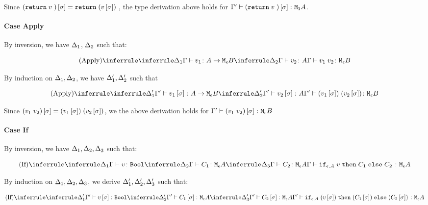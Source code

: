 {        Since $(\texttt{return} \; v\;)\left[\sigma\right] = \texttt{return} \;(v\left[\sigma\right])\;$, the type derivation above holds for $\Gamma' \vdash (\texttt{return} \; v\;)\left[\sigma\right] \colon \texttt{M}_{\texttt{1}}{A}$.

    \paragraph{Case Apply}
        By inversion, we have $\Delta_1$, $\Delta_2$ such that:

        \begin{equation}
            \ntreeruleII{Apply}{
                \treeruleI{\D_1}{\typerelation{\G}{v_1}{\aeb}}
                }{
                \treeruleI{\D_2}{\typerelation{\G}{v_2}{A}}
            }{\typerelation{\G}{\apply{v_1}{v_2}}{\meb}}
        \end{equation}

        By induction on $\Delta_1, \Delta_2$, we have $\Delta_1',\Delta_2'$ such that

        \begin{equation}
            \ntreeruleII{Apply}{
                \treeruleI{\D'_1}{\typerelation{\G'}{v_1\ssi}{\aeb}}
                }{
                \treeruleI{\D_2'}{\typerelation{\G'}{v_2\ssi}{A}}
            }{\typerelation{\G'}{\apply{(v_1\ssi)}{(v_2\ssi)}}{\meb}}
        \end{equation}

        Since $(v_1\; v_2)\left[\sigma\right] = (v_1\left[\sigma\right])\;(v_2\left[\sigma\right])$, we the above derivation holds for $\Gamma' \vdash (v_1\; v_2)\left[\sigma\right] \colon \texttt{M}_{\epsilon}{B}$
    \paragraph{Case If}
        By inversion, we have $\Delta_1,\Delta_2,\Delta_3$ such that:

        \begin{equation}
            \ntreeruleIII{If}{
                \treeruleI{\D_1}{\typerelation{\G}{v}{\B}}
                }{
                \treeruleI{\D_2}{\typerelation{\G}{C_1}{\mea}}
                }{
                \treeruleI{\D_3}{\typerelation{\G}{C_2}{\mea}}
            }{
                \typerelation{\G}{\ifthenelse{\e}{A}{v}{C_1}{C_2}}{\mea}
            }
        \end{equation}

        By induction on $\Delta_1,\Delta_2, \Delta_3$, we derive 
        $\Delta_1', \Delta_2',\Delta_3'$ such that:
        
        \begin{equation}
            \ntreeruleIII{If}{
                \treeruleI{\D_1'}{\typerelation{\G'}{v\ssi}{\B}}
                }{
                \treeruleI{\D_2'}{\typerelation{\G'}{C_1\ssi}{\mea}}
                }{
                \treeruleI{\D_3'}{\typerelation{\G'}{C_2\ssi}{\mea}}
            }{
                \typerelation{\G'}{\ifthenelse{\e}{A}{(v\ssi)}{(C_1\ssi)}{(C_2\ssi)}}{\mea}
            }
        \end{equation}

}

